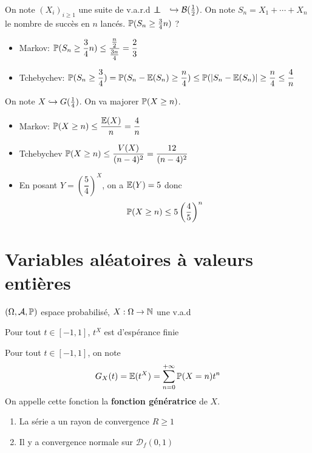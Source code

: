 \begin{ex}
    On note $(X_i)_{i\geq 1}$ une suite de v.a.r.d $\indep \quad \suit \mathcal  B(\frac{1}{2})$. On note $S_n=X_1+\cdots +X_n$ le nombre de succès en $n$ lancés. $\P(S_n\geq \frac{3}{4}n)$ ?
    \begin{itemize}
        \item Markov: $\displaystyle\P(S_n\geq \frac{3}{4}n)\leq \frac{\frac{n}{2}}{\frac{3n}{4}}=\frac{2}{3}$
        \item Tchebychev: $\displaystyle\P(S_n\geq \frac{3}{4})=\P(S_n-\E(S_n)\geq \frac{n}{4}) \leq \P(|S_n-\E(S_n)|\geq \frac{n}{4}\leq \frac{4}{n}$
    \end{itemize}
\end{ex}

\begin{ex}
    On note $X\suit G(\frac{1}{4})$. On va majorer $\P(X\geq n)$. \begin{itemize}
        \item Markov: $\P(X\geq n)\leq \dfrac{\E(X)}{n}=\dfrac{4}{n}$
        \item Tchebychev $\P(X\geq n)\leq \dfrac{V(X)}{(n-4)^2}=\dfrac{12}{(n-4)^2}$
        \item En posant $Y=\left( \dfrac{5}{4} \right) ^X$, on a $\E(Y)=5$ donc \[
                \P(X\geq n)\leq 5\left( \frac{4}{5} \right) ^n
        \] 
    \end{itemize}
\end{ex}

\section{Variables aléatoires à valeurs entières}

\begin{defprop}
    \Hyp $(\Omega, \mathcal A,\P)$ espace probabilisé, $X:\Omega\to \N$ une v.a.d
    \begin{concenum}
    \item Pour tout $t\in [-1,1]$, $t^X$ est d'espérance finie
    \item  Pour tout $t \in  [-1, 1]$, on note \[
            G_X(t)=\E(t^X)= \sum_{n=0}^{+\infty} \P(X=n)t^n
    \] 
    On appelle cette fonction la \textbf{fonction génératrice} de $X$. \begin{enumerate}
        \item La série a un rayon de convergence $R\geq 1$
        \item Il y a convergence normale sur $ \mathcal  D_f(0,1)$
    \end{enumerate}
    \end{concenum}
\end{defprop}

